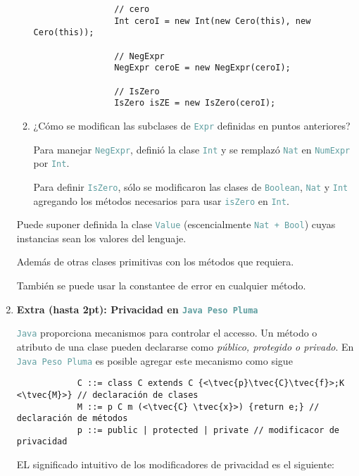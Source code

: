\documentclass{article}
\newcommand{\tx}[1]{\textcolor{CadetBlue} {\texttt{#1}}}
\newcommand{\tb}[1]{\textcolor{RoyalPurple} {\textbf{#1}}}
\newcommand{\ti}[1]{\textcolor{RoyalPurple} {\textit{#1}}}
\newcommand{\pt}[1]{\textcolor{RoyalPurple}{(#1pt)}}
\newcommand{\tvec}[1]{$\vec{\tx{#1}}$ }
\begin{document}
\begin{enumerate}
\begin{enumerate}
            \begin{verbatim}
                // cero
                Int ceroI = new Int(new Cero(this), new Cero(this));

                // NegExpr
                NegExpr ceroE = new NegExpr(ceroI);

                // IsZero
                IsZero isZE = new IsZero(ceroI);
            \end{verbatim}

            \item ¿Cómo se modifican las subclases de \tx{Expr} definidas en
            puntos anteriores?

            Para manejar \tx{NegExpr}, definió la clase \tx{Int} y se remplazó
            \tx{Nat} en \tx{NumExpr} por \tx{Int}.

            Para definir \tx{IsZero}, sólo se modificaron las clases de 
            \tx{Boolean}, \tx{Nat} y \tx{Int} agregando los métodos necesarios
            para usar \tx{isZero} en \tx{Int}.
        \end{enumerate}

        Puede suponer definida la clase \tx{Value} (escencialmente 
        \tx{Nat + Bool}) cuyas instancias sean los valores del lenguaje.

        Además de otras clases primitivas con los métodos que requiera.

        También se puede usar la constantee de error en cualquier método.

        \item \tb{Extra \pt{hasta 2}: Privacidad en \tx{Java Peso Pluma}}

        \tx{Java} proporciona mecanismos para controlar el accesso. Un método o
        atributo de una clase pueden declararse como \ti{público, protegido o 
        privado}. En \tx{Java Peso Pluma} es posible agregar este mecanismo como
        sigue

        \begin{verbatim}
            C ::= class C extends C {<\tvec{p}\tvec{C}\tvec{f}>;K <\tvec{M}>} // declaración de clases
            M ::= p C m (<\tvec{C} \tvec{x}>) {return e;} // declaración de métodos
            p ::= public | protected | private // modificacor de privacidad
        \end{verbatim}

        EL significado intuitivo de los modificadores de privacidad es el 
        siguiente:


\end{enumerate}
\end{document}
